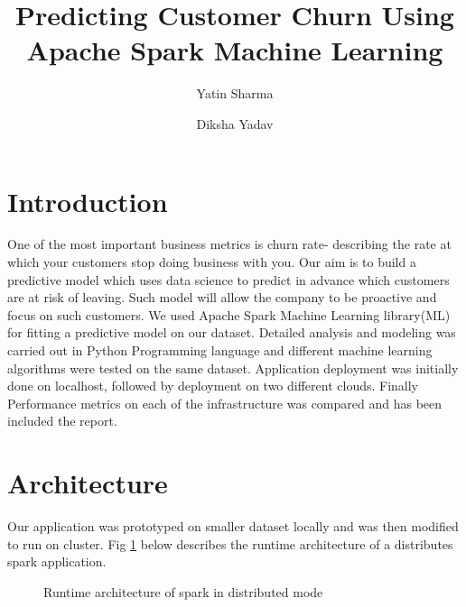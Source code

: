 \documentclass[9pt,twocolumn,twoside]{../../styles/osajnl}
\title{Predicting Customer Churn Using Apache Spark Machine Learning}
\author[1,*]{Yatin Sharma}
\author[1,*]{Diksha Yadav}
\affil[1]{School of Informatics and Computing, Bloomington, IN 47408, U.S.A.}
\affil[*]{Corresponding authors: yatins@indiana.edu, yadavd@iu.edu}
\begin{document}
\setcounter{tocdepth}{5}
\setcounter{secnumdepth}{5}
\maketitle

\tableofcontents %

\section{Introduction}
	One of the most important business metrics is churn rate- describing the rate at which your customers stop doing business with you. Our aim is to build a predictive model which uses data science to predict in advance which customers are at risk of leaving. Such model will allow the company to be proactive and focus on such customers. We used Apache Spark\cite{www-apache-spark} Machine Learning library(ML)\cite{www-Spark-ML} for fitting a predictive model on our dataset. Detailed analysis and modeling was carried out in Python Programming language and different machine learning algorithms were tested on the same dataset. Application deployment was initially done on localhost, followed by deployment on two different clouds. Finally Performance metrics on each of the infrastructure was compared and has been included the report.
	



\section{Architecture}
	Our application was prototyped on smaller dataset locally and was then modified to run on cluster. Fig \ref{Architecture} below describes the runtime architecture of a distributes spark application. 
	
	\begin{figure}[htbp]
		\centering
		\caption{Runtime architecture of spark in distributed mode\cite{Learn-Spark}}
		\label{Architecture}
		\end{figure}
			
\end{document}
